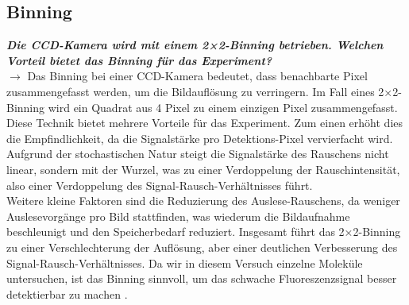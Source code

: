 \subsection{\label{subsec:FZV10}Binning}
\textbf{\textit{Die CCD-Kamera wird mit einem 2×2-Binning betrieben. Welchen Vorteil bietet das Binning für das Experiment?}} \\
$\rightarrow$
Das Binning bei einer CCD-Kamera bedeutet, dass benachbarte Pixel zusammengefasst werden,
um die Bildauflösung zu verringern. Im Fall eines 2×2-Binning wird ein Quadrat aus 4 Pixel
zu einem einzigen Pixel zusammengefasst. Diese Technik bietet mehrere Vorteile für das Experiment.
Zum einen erhöht dies die Empfindlichkeit, da die Signalstärke pro Detektions-Pixel vervierfacht
wird. Aufgrund der stochastischen Natur steigt die Signalstärke des Rauschens nicht linear,
sondern mit der Wurzel, was zu einer Verdoppelung der Rauschintensität, also einer Verdoppelung
des Signal-Rausch-Verhältnisses führt. \\
Weitere kleine Faktoren sind die Reduzierung des Auslese-Rauschens, da weniger Auslesevorgänge
pro Bild stattfinden, was wiederum die Bildaufnahme beschleunigt und den Speicherbedarf reduziert.
Insgesamt führt das 2×2-Binning zu einer Verschlechterung der Auflösung, aber einer deutlichen
Verbesserung des Signal-Rausch-Verhältnisses. Da wir in diesem Versuch einzelne Moleküle untersuchen,
ist das Binning sinnvoll, um das schwache Fluoreszenzsignal besser detektierbar zu machen \cite{MMS}. \\

